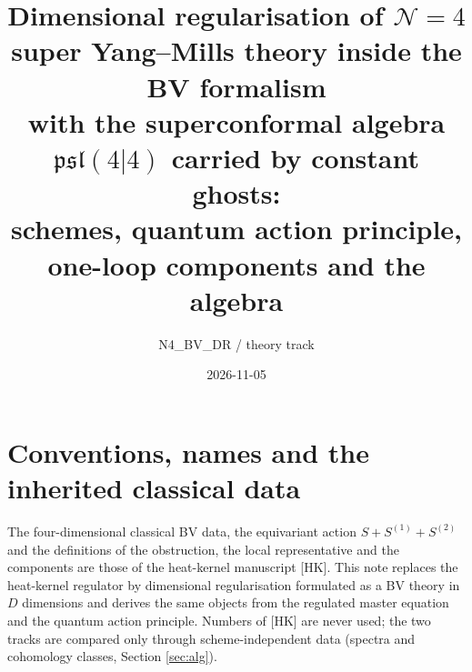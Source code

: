 \documentclass[11pt]{article}
\title{Dimensional regularisation of $\mathcal N=4$ super Yang--Mills theory inside the BV formalism\\[2pt]
\large with the superconformal algebra $\mathfrak{psl}(4|4)$ carried by constant ghosts:\\ schemes, quantum action principle, one-loop components and the algebra}
\author{N4\_BV\_DR / theory track}
\date{2026-11-05}
\theoremstyle{definition}
\numberwithin{equation}{section}
\begin{document}
\maketitle
\tableofcontents

\section{Conventions, names and the inherited classical data}

The four-dimensional classical BV data, the equivariant action $S+S^{(1)}+S^{(2)}$ and the definitions of the obstruction, the local representative and the components are those of the heat-kernel manuscript [HK]. This note replaces the heat-kernel regulator by dimensional regularisation formulated as a BV theory in $D$ dimensions and derives the same objects from the regulated master equation and the quantum action principle. Numbers of [HK] are never used; the two tracks are compared only through scheme-independent data (spectra and cohomology classes, Section \ref{sec:alg}).
\end{document}
